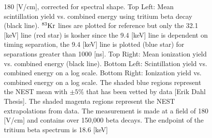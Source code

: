\begin{figure}[h!]
\caption{180 [V/cm], corrected for spectral shape. Top Left: Mean scintillation yield vs. combined energy using tritium beta decay (black line). $\rm^{83}Kr$ lines are plotted for reference but only the 32.1 [keV] line (red star) is kosher since the 9.4 [keV] line is dependent on timing separation, the 9.4 [keV] line is plotted (blue star) for separations greater than 1000 [ns]. Top Right: Mean ionization yield vs. combined energy (black line). Bottom Left: Scintillation yield vs. combined energy on a log scale. Bottom Right: Ionization yield vs. combined energy on a log scale. The shaded blue regions represent the NEST mean with $\pm 5\%$ that has been vetted by data [Erik Dahl Thesis]. The shaded magenta regions represent the NEST extrapolations from data. The measurement is made at a field of 180 [V/cm] and contains over 150,000 beta decays. The endpoint of the tritium beta spectrum is 18.6 [keV]}
\label{fig:L_Q_Yield_180}
\end{figure}




